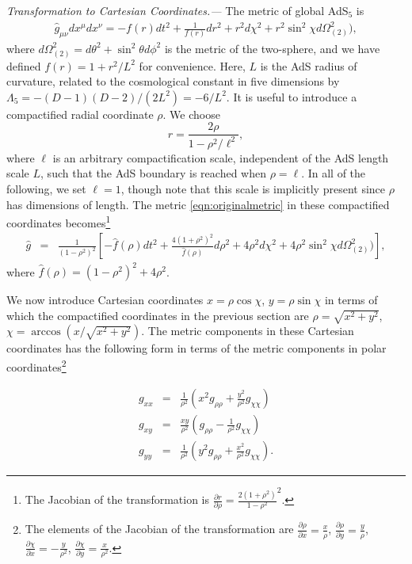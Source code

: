 \documentclass[prl,twocolumn,superscriptaddress]{revtex4-1}
\newcommand{\PRLsection}[1]{\emph{#1.---}}
\begin{document}
\PRLsection{Transformation to Cartesian Coordinates}
The metric of global AdS$_5$ is
\begin{eqnarray}\label{eqn:originalmetric}
\hat{g}_{\mu\nu} dx^\mu dx^\nu = - f(r) dt^2 + \frac{1}{f(r)} dr^2 +r^2 d\chi^2 + r^2 \sin^2\chi d\Omega_{(2)}^2),
\end{eqnarray}
where $d\Omega_{(2)}^2=d\theta^2 + \sin^2\theta d\phi^2$ is the metric of the two-sphere, and we have defined $f(r)=1+r^2/L^2$ for convenience. 
Here, $L$ is the AdS radius of curvature, related to the cosmological constant in five dimensions by $\Lambda_5 = -(D-1)(D-2)/(2 L^2) = -6/L^2$. 
It is useful to introduce a compactified radial coordinate $\rho$. We choose
\begin{equation}\label{eqn:r_def}
r=\frac{2\rho}{1-\rho^2/\ell^2},
\end{equation}
where $\ell$ is an arbitrary compactification scale, independent of the AdS length scale $L$, such that the AdS boundary is reached when $\rho=\ell$. 
In all of the following, we set $\ell=1$, though note that this scale is implicitly present since $\rho$ has dimensions of length. 
The metric \eqref{eqn:originalmetric} in these compactified coordinates becomes\footnote{The Jacobian of the transformation is
$\frac{\partial r}{\partial \rho} = \frac{2(1+\rho^2)}{1-\rho^2}^2$.
}
\begin{eqnarray*}
\hat{g}
&=& \frac{1}{(1-\rho^2)^2} \left[ -\hat{f}(\rho) dt^2 + \frac{4(1+\rho^2)^2}{\hat{f}(\rho)} d\rho^2 + 4\rho^2 d\chi^2 + 4\rho^2 \sin^2\chi d\Omega_{(2)}^2) \right], 
\end{eqnarray*}
where $\hat{f}(\rho) = (1-\rho^2)^2+4\rho^2$.

We now introduce Cartesian coordinates $x=\rho\cos\chi$, $y=\rho\sin\chi$ in terms of which the compactified coordinates in the previous section are $\rho=\sqrt{x^2+y^2}$, $\chi=\arccos\left( x/\sqrt{x^2+y^2} \right)$.
The metric components in these Cartesian coordinates has the following form in terms of the metric components in polar coordinates\footnote{The elements of the Jacobian of the transformation are
$\frac{\partial \rho}{\partial x} = \frac{x}{\rho}$,
$\frac{\partial \rho}{\partial y} = \frac{y}{\rho}$,
$\frac{\partial \chi}{\partial x} = -\frac{y}{\rho^2}$,
$\frac{\partial \chi}{\partial y} = \frac{x}{\rho^2}$.
}

\begin{eqnarray}\label{eqn:cartesianmetric_components}
g_{xx} &=& \frac{1}{\rho^2} \left( x^2 g_{\rho\rho} + \frac{y^2}{\rho^2} g_{\chi\chi} \right) \nonumber \\
g_{xy} &=& \frac{xy}{\rho^2} \left( g_{\rho\rho} - \frac{1}{\rho^2} g_{\chi\chi} \right) \nonumber \\
g_{yy} &=& \frac{1}{\rho^2} \left( y^2 g_{\rho\rho} + \frac{x^2}{\rho^2} g_{\chi\chi} \right).
\end{eqnarray}
\end{document}
